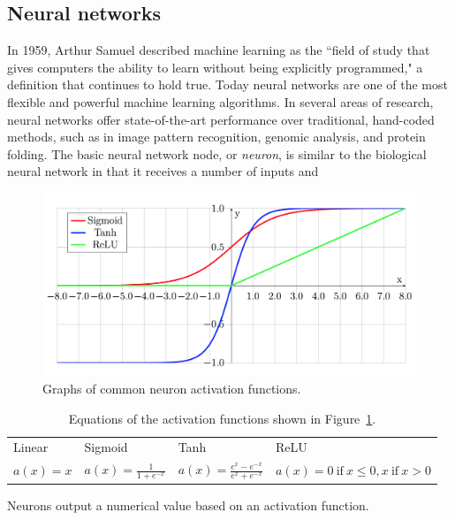 \documentclass[12pt,oneside,onecolumn,a4paper]{article}
\begin{document}
\subsection{Neural networks}
In 1959, Arthur Samuel described machine learning as the ``field of study that gives computers the ability to learn without being
explicitly programmed," a definition that continues to hold true. Today neural networks are one of the most flexible and powerful machine learning algorithms. In several areas of research, neural networks offer state-of-the-art performance over traditional, hand-coded methods, such as in image pattern recognition, genomic analysis, and protein folding. The basic neural network node, or \textit{neuron}, is similar to the biological neural network in that it receives a number of inputs and 
\begin{figure}[H]
\begin{center}
\includegraphics[width=0.8\columnwidth]{figures/activations}
\caption{Graphs of common neuron activation functions.\label{fig:activations}}
\end{center}
\end{figure}

\begin{table}[H]
\begin{center}
\caption{Equations of the activation functions shown in Figure~\ref{fig:activations}.}
\begin{tabular}{ l | l | l | l }
 Linear & Sigmoid & Tanh & ReLU\\ 
 $a(x) = x$ & $a(x) = \frac{1}{1+e^{-x}}$ & $a(x) = \frac{e^{x}-e^{-x}}{e^{x}+e^{-x}}$ & $a(x) = 0\ \textrm{if}\ x \leq 0, x\ \textrm{if}\ x > 0$\\   
\end{tabular}
\label{table:1}
\end{center}
\end{table}
Neurons output a numerical value based on an activation function.
\end{document}
